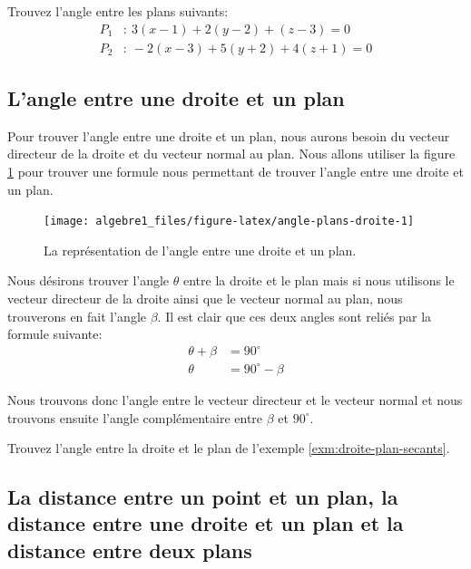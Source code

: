 \documentclass[]{book}
\theoremstyle{definition}
\theoremstyle{definition}
\theoremstyle{definition}
\theoremstyle{remark}
\let\BeginKnitrBlock\begin \let\EndKnitrBlock\end
\begin{document}
\BeginKnitrBlock{example}
\protect\hypertarget{exm:unnamed-chunk-233}{}{\label{exm:unnamed-chunk-233} }Trouvez l'angle entre les plans suivants:
\begin{align*}
P_1 &: \ 3(x-1)+2(y-2)+(z-3) = 0 \\
P_2 &: \ -2(x-3)+5(y+2)+4(z+1) = 0
\end{align*}
\EndKnitrBlock{example}

\hypertarget{langle-entre-une-droite-et-un-plan}{%
\subsection{L'angle entre une droite et un plan}\label{langle-entre-une-droite-et-un-plan}}

Pour trouver l'angle entre une droite et un plan, nous aurons besoin du vecteur directeur de la droite et du vecteur normal au plan. Nous allons utiliser la figure \ref{fig:angle-plans-droite} pour trouver une formule nous permettant de trouver l'angle entre une droite et un plan.

\begin{figure}

{\centering \texttt{[image: algebre1\_files/figure-latex/angle-plans-droite-1]} 

}

\caption{La représentation de l'angle entre une droite et un plan.}\label{fig:angle-plans-droite}
\end{figure}

Nous désirons trouver l'angle \(\theta\) entre la droite et le plan mais si nous utilisons le vecteur directeur de la droite ainsi que le vecteur normal au plan, nous trouverons en fait l'angle \(\beta\). Il est clair que ces deux angles sont reliés par la formule suivante:
\begin{align*}
\theta + \beta &= 90^{\circ} \\
\theta &= 90^{\circ}-\beta
\end{align*}

Nous trouvons donc l'angle entre le vecteur directeur et le vecteur normal et nous trouvons ensuite l'angle complémentaire entre \(\beta\) et \(90^{\circ}\).

\BeginKnitrBlock{example}
\protect\hypertarget{exm:unnamed-chunk-234}{}{\label{exm:unnamed-chunk-234} }Trouvez l'angle entre la droite et le plan de l'exemple \ref{exm:droite-plan-secants}.
\EndKnitrBlock{example}

\hypertarget{la-distance-entre-un-point-et-un-plan-la-distance-entre-une-droite-et-un-plan-et-la-distance-entre-deux-plans}{%
\subsection{La distance entre un point et un plan, la distance entre une droite et un plan et la distance entre deux plans}\label{la-distance-entre-un-point-et-un-plan-la-distance-entre-une-droite-et-un-plan-et-la-distance-entre-deux-plans}}
\end{document}
